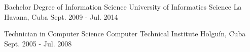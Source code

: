 


\begin{cventries}


\cventry
{Bachelor Degree of Information Science} %
{University of Informatics Science} %
{La Havana, Cuba} %
{Sept. 2009 - Jul. 2014} %
{ %
}


\cventry
{Technician in Computer Science} %
{Computer Technical Institute} %
{Holguín, Cuba} %
{Sept. 2005 - Jul. 2008} %
{ %
}


\end{cventries}
